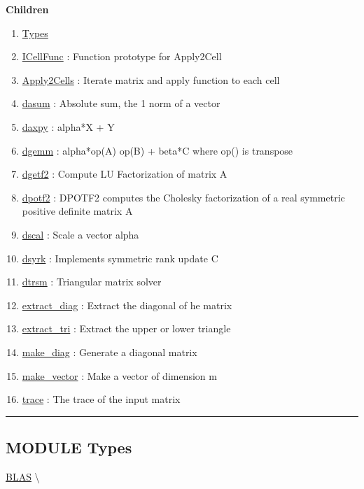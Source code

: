 \textbf{Children}
\begin{enumerate}
\item \hyperlink{ecldoc:BLAS.Types}{Types}
\item \hyperlink{ecldoc:blas.icellfunc}{ICellFunc}
: Function prototype for Apply2Cell
\item \hyperlink{ecldoc:blas.apply2cells}{Apply2Cells}
: Iterate matrix and apply function to each cell
\item \hyperlink{ecldoc:blas.dasum}{dasum}
: Absolute sum, the 1 norm of a vector
\item \hyperlink{ecldoc:blas.daxpy}{daxpy}
: alpha*X + Y
\item \hyperlink{ecldoc:blas.dgemm}{dgemm}
: alpha*op(A) op(B) + beta*C where op() is transpose
\item \hyperlink{ecldoc:blas.dgetf2}{dgetf2}
: Compute LU Factorization of matrix A
\item \hyperlink{ecldoc:blas.dpotf2}{dpotf2}
: DPOTF2 computes the Cholesky factorization of a real symmetric positive definite matrix A
\item \hyperlink{ecldoc:blas.dscal}{dscal}
: Scale a vector alpha
\item \hyperlink{ecldoc:blas.dsyrk}{dsyrk}
: Implements symmetric rank update C
\item \hyperlink{ecldoc:blas.dtrsm}{dtrsm}
: Triangular matrix solver
\item \hyperlink{ecldoc:blas.extract_diag}{extract\_diag}
: Extract the diagonal of he matrix
\item \hyperlink{ecldoc:blas.extract_tri}{extract\_tri}
: Extract the upper or lower triangle
\item \hyperlink{ecldoc:blas.make_diag}{make\_diag}
: Generate a diagonal matrix
\item \hyperlink{ecldoc:blas.make_vector}{make\_vector}
: Make a vector of dimension m
\item \hyperlink{ecldoc:blas.trace}{trace}
: The trace of the input matrix
\end{enumerate}

\rule{\linewidth}{0.5pt}

\subsection*{\textsf{\colorbox{headtoc}{\color{white} MODULE}
Types}}

\hypertarget{ecldoc:BLAS.Types}{}
\hspace{0pt} \hyperlink{ecldoc:BLAS}{BLAS} \textbackslash 

